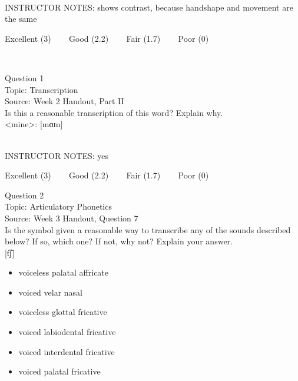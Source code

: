 \documentclass[12pt]{article}
\begin{document}
~\\
INSTRUCTOR NOTES: shows contrast, because handshape and movement are the same


\vfill
Excellent (3) ~~~ Good (2.2) ~~~ Fair (1.7) ~~~ Poor (0)
\newpage

\begin{center}
\textbf{{\color{red}{\HUGE END OF EXAM}}}\\

\end{center}
\newpage

\begin{center}
\textbf{{\color{blue}{\HUGE START OF EXAM\\}}}

\textbf{{\color{blue}{\HUGE Student ID: 36116\\}}}

\textbf{{\color{blue}{\HUGE \\}}}

\end{center}
\newpage

{\large Question 1}\\

Topic: Transcription\\
Source: Week 2 Handout, Part II\\

Is this a reasonable transcription of this word? Explain why.\\

<mine>: {[mɑɪn]}


~\\
INSTRUCTOR NOTES: yes


\vfill
Excellent (3) ~~~ Good (2.2) ~~~ Fair (1.7) ~~~ Poor (0)
\newpage

{\large Question 2}\\

Topic: Articulatory Phonetics\\
Source: Week 3 Handout, Question 7\\

Is the symbol given a reasonable way to transcribe any of the sounds described below? If so, which one? If not, why not? Explain your answer.\\

{[t͡ʃ]}

\begin{itemize} \item voiceless palatal affricate \item voiced velar nasal \item voiceless glottal fricative \item voiced labiodental fricative \item voiced interdental fricative \item voiced palatal fricative \end{itemize}
\end{document}
